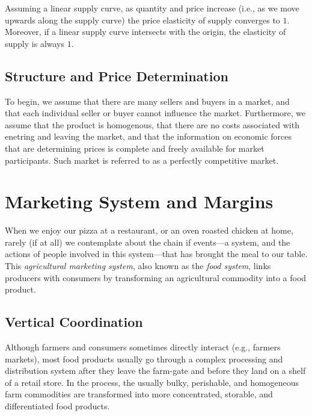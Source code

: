 \documentclass[
]{book}
\begin{document}
Assuming a linear supply curve, as quantity and price increase (i.e., as we move upwards along the supply curve) the price elasticity of supply converges to \(1\). Moreover, if a linear supply curve intersects with the origin, the elasticity of supply is always \(1\).

\hypertarget{structure-and-price-determination}{%
\section{Structure and Price Determination}\label{structure-and-price-determination}}

To begin, we assume that there are many sellers and buyers in a market, and that each individual seller or buyer cannot influence the market. Furthermore, we assume that the product is homogenous, that there are no costs associated with enetring and leaving the market, and that the information on economic forces that are determining prices is complete and freely available for market participants. Such market is referred to as a perfectly competitive market.

\hypertarget{marketing-system-and-margins}{%
\chapter{Marketing System and Margins}\label{marketing-system-and-margins}}

When we enjoy our pizza at a restaurant, or an oven roasted chicken at home, rarely (if at all) we contemplate about the chain if events---a system, and the actions of people involved in this system---that has brought the meal to our table. This \emph{agricultural marketing system}, also known as the \emph{food system}, links producers with consumers by transforming an agricultural commodity into a food product.

\hypertarget{vertical-coordination}{%
\section{Vertical Coordination}\label{vertical-coordination}}

Although farmers and consumers sometimes directly interact (e.g., farmers markets), most food products usually go through a complex processing and distribution system after they leave the farm-gate and before they land on a shelf of a retail store. In the process, the usually bulky, perishable, and homogeneous farm commodities are transformed into more concentrated, storable, and differentiated food products.
\end{document}
